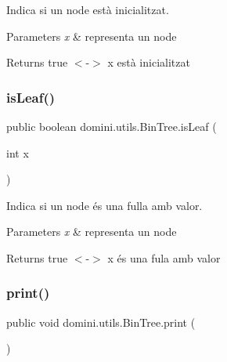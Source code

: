 Indica si un node està inicialitzat. 


\begin{DoxyParams}{Parameters}
{\em x} & representa un node \\
\hline
\end{DoxyParams}
\begin{DoxyReturn}{Returns}
true $<$-\/$>$ x està inicialitzat 
\end{DoxyReturn}
\mbox{\label{classdomini_1_1utils_1_1BinTree_a37030e961f5613a5c74984ac002d965b}} 
\subsubsection{\texorpdfstring{is\+Leaf()}{isLeaf()}}
{\footnotesize\ttfamily public boolean domini.\+utils.\+Bin\+Tree.\+is\+Leaf (\begin{DoxyParamCaption}\item[{int}]{x }\end{DoxyParamCaption})\hspace{0.3cm}{\ttfamily [inline]}}



Indica si un node és una fulla amb valor. 


\begin{DoxyParams}{Parameters}
{\em x} & representa un node \\
\hline
\end{DoxyParams}
\begin{DoxyReturn}{Returns}
true $<$-\/$>$ x és una fula amb valor 
\end{DoxyReturn}
\mbox{\label{classdomini_1_1utils_1_1BinTree_a0dc4daeb2d0e221cc8fc702d1d0ec795}} 
\subsubsection{\texorpdfstring{print()}{print()}}
{\footnotesize\ttfamily public void domini.\+utils.\+Bin\+Tree.\+print (\begin{DoxyParamCaption}{ }\end{DoxyParamCaption})\hspace{0.3cm}{\ttfamily [inline]}}



